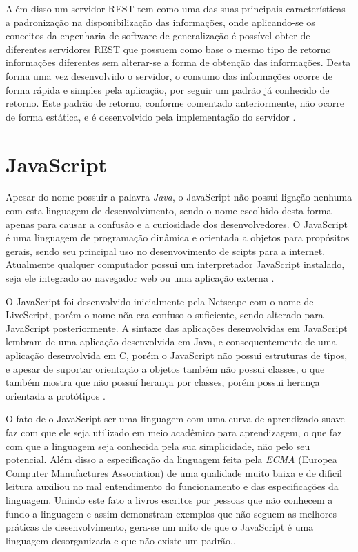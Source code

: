 Além disso um servidor REST tem como uma das suas principais características a padronização na disponibilização das informações, onde aplicando-se os conceitos da engenharia de software de generalização é possível obter de diferentes servidores REST que possuem como base o mesmo tipo de retorno informações diferentes sem alterar-se a forma de obtenção das informações. Desta forma uma vez desenvolvido o servidor, o consumo das informações ocorre de forma rápida e simples pela aplicação, por seguir um padrão já conhecido de retorno. Este padrão de retorno, conforme comentado anteriormente, não ocorre de forma estática, e é desenvolvido pela implementação do servidor \cite{RESTFielding}.

\section{JavaScript}
Apesar do nome possuir a palavra \emph{Java}, o JavaScript não possui ligação nenhuma com esta linguagem de desenvolvimento, sendo o nome escolhido desta forma apenas para causar a confusão e a curiosidade dos desenvolvedores. O JavaScript é uma linguagem de programação dinâmica e orientada a objetos para propósitos gerais, sendo seu principal uso no desenvovimento de scipts para a internet. Atualmente qualquer computador possui um interpretador JavaScript instalado, seja ele integrado ao navegador web ou uma aplicação externa \cite{JavaScriptCrockford}.

O JavaScript foi desenvolvido inicialmente pela Netscape com o nome de LiveScript, porém o nome nõa era confuso o suficiente, sendo alterado para JavaScript posteriormente. A sintaxe das aplicações desenvolvidas em JavaScript lembram de uma aplicação desenvolvida em Java, e consequentemente de uma aplicação desenvolvida em C, porém o JavaScript não possui estruturas de tipos, e apesar de suportar orientação a objetos também não possui classes, o que também mostra que não possuí herança por classes, porém possui herança orientada a protótipos \cite{JavaScriptCrockford}.

O fato de o JavaScript ser uma linguagem com uma curva de aprendizado suave faz com que ele seja utilizado em meio acadêmico para aprendizagem, o que faz com que a linguagem seja conhecida pela sua simplicidade, não pelo seu potencial. Além disso a especificação da linguagem feita pela \emph{ECMA} (Europea Computer Manufactures Association) de uma qualidade muito baixa e de dificil leitura auxiliou no mal entendimento do funcionamento e das especificações da linguagem. Unindo este fato a livros escritos por pessoas que não conhecem a fundo a linguagem e assim demonstram exemplos que não seguem as melhores práticas de desenvolvimento, gera-se um mito de que o JavaScript é uma linguagem desorganizada e que não existe um padrão.\cite{JavaScriptCrockford}.

